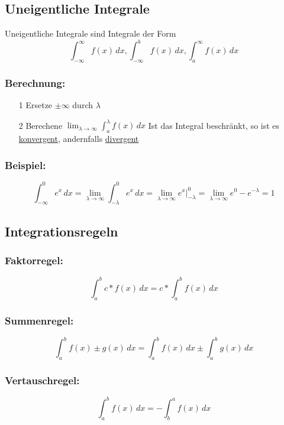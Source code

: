 \documentclass[11pt]{amsart}
\theoremstyle{remark}
\begin{document}
\subsection{Uneigentliche Integrale}
Uneigentliche Integrale sind Integrale der Form
\begin{equation*}
	\int_{-\infty}^\infty f(x)\,dx , \int_{-\infty}^b f(x)\,dx , \int_{a}^\infty f(x)\,dx 
\end{equation*}
\subsubsection*{Berechnung:}
\begin{itemize}
\item[1] Ersetze $\pm\infty$ durch $\lambda$
\item[2] Berechene $\lim_{\lambda \to \infty} \int_a^\lambda f(x)\,dx$\newline
	Ist das Integral beschr\"ankt, so ist es \underline{konvergent}, andernfalls \underline{divergent}
\end{itemize}
\subsubsection*{Beispiel:}
\begin{equation*}
	\int_{-\infty}^0 e^x \,dx = \lim_{\lambda \to \infty} \int_{-\lambda}^0 e^x \,dx = \lim_{\lambda \to \infty} 	
	e^x \vert_{-\lambda}^0 = \lim_{\lambda \to \infty} e^0-e^{-\lambda} = 1
\end{equation*}
\subsection{Integrationsregeln}
\subsubsection{Faktorregel:}
\begin{equation*}
	\int_a^b c*f(x)\,dx = c * \int_a^b f(x) \,dx
\end{equation*}
\subsubsection{Summenregel:}
\begin{equation*}
	\int_a^b f(x)\pm g(x)\,dx = \int_a^b f(x) \,dx \pm \int_a^b g(x) \,dx
\end{equation*}
\subsubsection{Vertauschregel:}
\begin{equation*}
	\int_a^b f(x)\,dx = - \int_b^a f(x) \,dx
\end{equation*}
\end{document}
